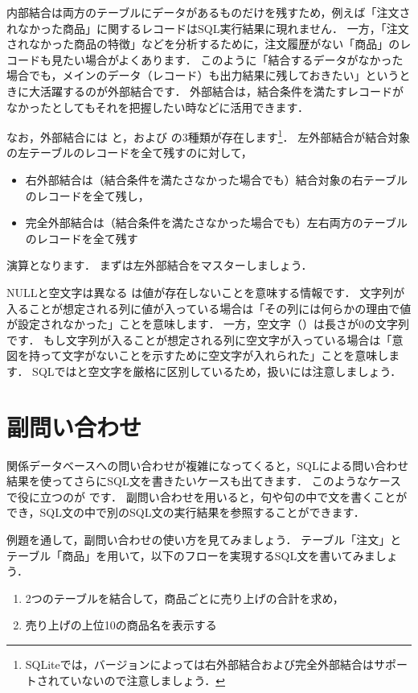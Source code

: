 内部結合は両方のテーブルにデータがあるものだけを残すため，例えば「注文されなかった商品」に関するレコードはSQL実行結果に現れません．
一方，「注文されなかった商品の特徴」などを分析するために，注文履歴がない「商品」のレコードも見たい場合がよくあります．
このように「結合するデータがなかった場合でも，メインのデータ（レコード）も出力結果に残しておきたい」というときに大活躍するのが外部結合です．
外部結合は，結合条件を満たすレコードがなかったとしてもそれを把握したい時などに活用できます．

なお，外部結合には と，および の3種類が存在します\footnote{SQLiteでは，バージョンによっては右外部結合および完全外部結合はサポートされていないので注意しましょう．}．
左外部結合が結合対象の左テーブルのレコードを全て残すのに対して，
\begin{itemize}
\item 右外部結合は（結合条件を満たさなかった場合でも）結合対象の右テーブルのレコードを全て残し，
\item 完全外部結合は（結合条件を満たさなかった場合でも）左右両方のテーブルのレコードを全て残す
\end{itemize}
演算となります．
まずは左外部結合をマスターしましょう．

\begin{notebox}{NULLと空文字は異なる}
は値が存在しないことを意味する情報です．
文字列が入ることが想定される列に値が入っている場合は「その列には何らかの理由で値が設定されなかった」ことを意味します．
一方，空文字（）は長さが0の文字列です．
もし文字列が入ることが想定される列に空文字が入っている場合は「意図を持って文字がないことを示すために空文字が入れられた」ことを意味します．
SQLではと空文字を厳格に区別しているため，扱いには注意しましょう．
\end{notebox}


\section{副問い合わせ}\label{sec:subquery}
関係データベースへの問い合わせが複雑になってくると，SQLによる問い合わせ結果を使ってさらにSQL文を書きたいケースも出てきます．
このようなケースで役に立つのが です．
副問い合わせを用いると，句や句の中で文を書くことができ，SQL文の中で別のSQL文の実行結果を参照することができます．

例題を通して，副問い合わせの使い方を見てみましょう．
テーブル「注文」とテーブル「商品」を用いて，以下のフローを実現するSQL文を書いてみましょう．
\begin{enumerate}
\item 2つのテーブルを結合して，商品ごとに売り上げの合計を求め，
\item 売り上げの上位10の商品名を表示する
\end{enumerate}

